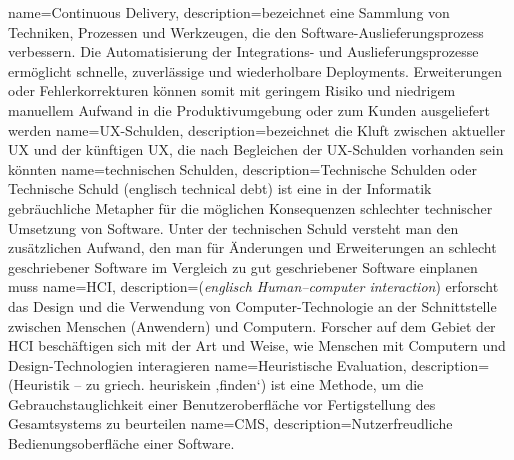 {
	name=Continuous Delivery,
	description={bezeichnet eine Sammlung von Techniken, Prozessen und Werkzeugen, die den Software-Auslieferungsprozess verbessern. Die Automatisierung der Integrations- und Auslieferungsprozesse ermöglicht schnelle, zuverlässige und wiederholbare Deployments. Erweiterungen oder Fehlerkorrekturen können somit mit geringem Risiko und niedrigem manuellem Aufwand in die Produktivumgebung oder zum Kunden ausgeliefert werden}
}
{
	name=UX-Schulden,
	description={bezeichnet die Kluft zwischen aktueller UX und der künftigen UX, die nach Begleichen der UX-Schulden vorhanden sein könnten}
}
{
	name=technischen Schulden,
	description={Technische Schulden oder Technische Schuld (englisch technical debt) ist eine in der Informatik gebräuchliche Metapher für die möglichen Konsequenzen schlechter technischer Umsetzung von Software. Unter der technischen Schuld versteht man den zusätzlichen Aufwand, den man für Änderungen und Erweiterungen an schlecht geschriebener Software im Vergleich zu gut geschriebener Software einplanen muss}
}
{
	name=HCI,
	description={(\textit{englisch Human–computer interaction}) erforscht das Design und die Verwendung von Computer-Technologie an der Schnittstelle zwischen Menschen (Anwendern) und Computern. Forscher auf dem Gebiet der HCI beschäftigen sich mit der Art und Weise, wie Menschen mit Computern und Design-Technologien interagieren}
}
{
	name=Heuristische Evaluation,
	description={(Heuristik – zu griech. heuriskein ‚finden‘) ist eine Methode, um die Gebrauchstauglichkeit einer Benutzeroberfläche vor Fertigstellung des Gesamtsystems zu beurteilen}
}
{
	name=CMS,
	description={Nutzerfreudliche Bedienungsoberfläche einer Software.}
}
